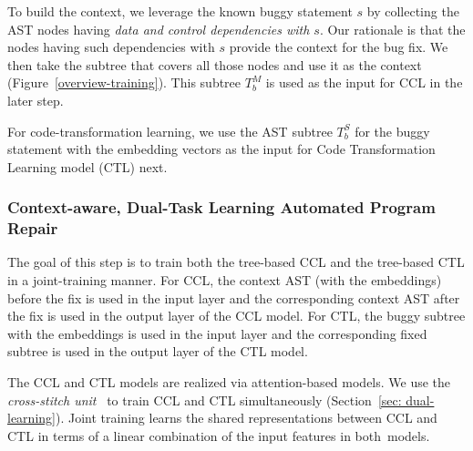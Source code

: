 To build the context, we leverage the known buggy statement $s$ by
collecting the AST nodes having {\em data and control dependencies
  with $s$}. Our rationale is that the nodes having such dependencies
with $s$ provide the context for the bug fix.
%
We then take the subtree that covers all those nodes and use it as the
context (Figure~\ref{overview-training}). This subtree $T_b^{M}$ is
used as the input for CCL in the later step.

For code-transformation learning, we use the AST subtree $T_b^{S}$ for
the buggy statement with the embedding vectors as the input for
Code Transformation Learning model (CTL) next.


\subsubsection{Context-aware, Dual-Task Learning Automated Program
  Repair}

The goal of this step is to train both the tree-based CCL and the
tree-based CTL in a joint-training manner. For CCL, the context AST
(with the embeddings) before the fix is used in the input layer and
the corresponding context AST after the fix is used in the output
layer of the CCL model. For CTL, the buggy subtree with the embeddings
is used in the input layer and the corresponding fixed subtree is used
in the output layer of the CTL model.

The CCL and CTL models are realized via attention-based 
models. We use the {\em cross-stitch unit}~\cite{misra2016cross} to
train CCL and CTL simultaneously (Section~\ref{sec: dual-learning}).
Joint training learns the shared representations between
CCL and CTL in terms of a linear combination of the input features in
both~models.

